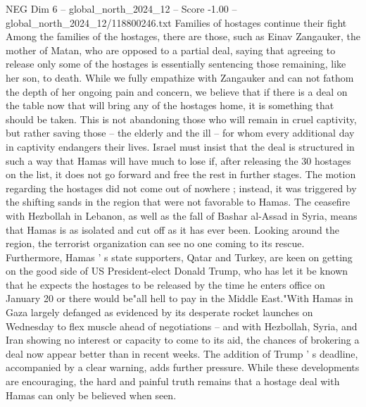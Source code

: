 \begin{textsample}{NEG Dim 6 – global\_north\_2024\_12 – Score -1.00 – global\_north\_2024\_12/118800246.txt}
Families of hostages continue their fight Among the families of the hostages, there are those, such as Einav Zangauker, the mother of Matan, who are opposed to a partial deal, saying that agreeing to release only some of the hostages is essentially sentencing those remaining, like her son, to death.
While we fully empathize with Zangauker and can not fathom the depth of her ongoing pain and concern, we believe that if there is a deal on the table now that will bring any of the hostages home, it is something that should be taken.
This is not abandoning those who will remain in cruel captivity, but rather saving those -- the elderly and the ill -- for whom every additional day in captivity endangers their lives.
Israel must insist that the deal is structured in such a way that Hamas will have much to lose if, after releasing the 30 hostages on the list, it does not go forward and free the rest in further stages.
The motion regarding the hostages did not come out of nowhere ; instead, it was triggered by the shifting sands in the region that were not favorable to Hamas.
The ceasefire with Hezbollah in Lebanon, as well as the fall of Bashar al-Assad in Syria, means that Hamas is as isolated and cut off as it has ever been.
Looking around the region, the terrorist organization can see no one coming to its rescue.
Furthermore, Hamas ' s state supporters, Qatar and Turkey, are keen on getting on the good side of US President-elect Donald Trump, who has let it be known that he expects the hostages to be released by the time he enters office on January 20 or there would be"all hell to pay in the Middle East."With Hamas in Gaza largely defanged as evidenced by its desperate rocket launches on Wednesday to flex muscle ahead of negotiations -- and with Hezbollah, Syria, and Iran showing no interest or capacity to come to its aid, the chances of brokering a deal now appear better than in recent weeks.
The addition of Trump ' s deadline, accompanied by a clear warning, adds further pressure.
While these developments are encouraging, the hard and painful truth remains that a hostage deal with Hamas can only be believed when seen.

\end{textsample}
